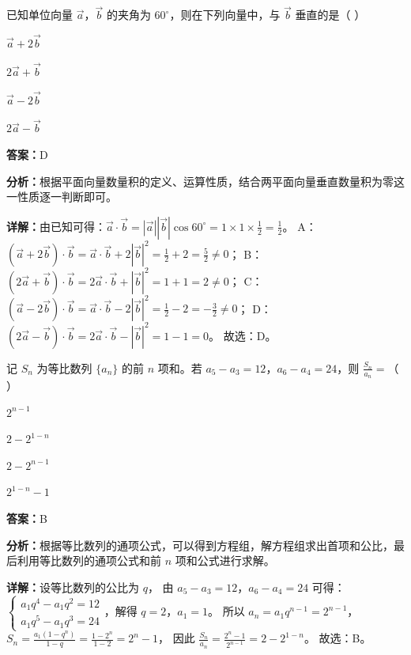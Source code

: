 \begin{question}[points=5]
已知单位向量 $\vec{a}$，$\vec{b}$ 的夹角为 $60^\circ$，则在下列向量中，与 $\vec{b}$ 垂直的是（ ）
\begin{choices}
  \item $\vec{a}+2\vec{b}$
  \item $2\vec{a}+\vec{b}$
  \item $\vec{a}-2\vec{b}$
  \item $2\vec{a}-\vec{b}$
\end{choices}
\begin{solution}
\textbf{答案：}D

\textbf{分析：}根据平面向量数量积的定义、运算性质，结合两平面向量垂直数量积为零这一性质逐一判断即可。

\textbf{详解：}由已知可得：$\vec{a}\cdot\vec{b}=|\vec{a}||\vec{b}|\cos60^\circ=1\times1\times\frac{1}{2}=\frac{1}{2}$。
A：$(\vec{a}+2\vec{b})\cdot\vec{b}=\vec{a}\cdot\vec{b}+2|\vec{b}|^2=\frac{1}{2}+2=\frac{5}{2}\neq0$；
B：$(2\vec{a}+\vec{b})\cdot\vec{b}=2\vec{a}\cdot\vec{b}+|\vec{b}|^2=1+1=2\neq0$；
C：$(\vec{a}-2\vec{b})\cdot\vec{b}=\vec{a}\cdot\vec{b}-2|\vec{b}|^2=\frac{1}{2}-2=-\frac{3}{2}\neq0$；
D：$(2\vec{a}-\vec{b})\cdot\vec{b}=2\vec{a}\cdot\vec{b}-|\vec{b}|^2=1-1=0$。
故选：D。
\end{solution}
\end{question}

\begin{question}[points=5]
记 $S_n$ 为等比数列 $\{a_n\}$ 的前 $n$ 项和。若 $a_5-a_3=12$，$a_6-a_4=24$，则 $\frac{S_n}{a_n}=$（ ）
\begin{choices}
  \item $2^{n-1}$
  \item $2-2^{1-n}$
  \item $2-2^{n-1}$
  \item $2^{1-n}-1$
\end{choices}
\begin{solution}
\textbf{答案：}B

\textbf{分析：}根据等比数列的通项公式，可以得到方程组，解方程组求出首项和公比，最后利用等比数列的通项公式和前 $n$ 项和公式进行求解。

\textbf{详解：}设等比数列的公比为 $q$，
由 $a_5-a_3=12$，$a_6-a_4=24$ 可得：
$\begin{cases} a_1 q^4 - a_1 q^2 =12 \\ a_1 q^5 - a_1 q^3 =24 \end{cases}$，解得 $q=2$，$a_1=1$。
所以 $a_n = a_1 q^{n-1}=2^{n-1}$，$S_n = \frac{a_1(1-q^n)}{1-q} = \frac{1-2^n}{1-2}=2^n-1$，
因此 $\frac{S_n}{a_n} = \frac{2^n-1}{2^{n-1}} = 2 - 2^{1-n}$。
故选：B。
\end{solution}
\end{question}

